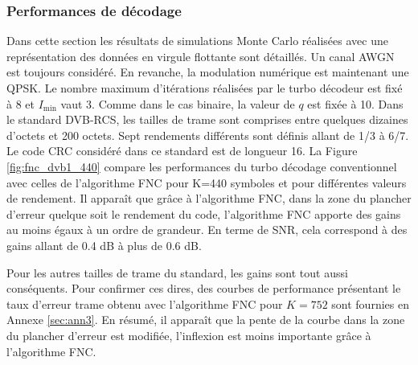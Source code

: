 \subsubsection{Performances de décodage}
Dans cette section les résultats de simulations Monte Carlo réalisées avec une représentation des données en virgule
flottante sont détaillés. Un canal AWGN est toujours considéré. En revanche, la modulation numérique est maintenant une QPSK. Le 
nombre maximum d'itérations réalisées par le turbo décodeur est fixé à 8 et $I_{\text{min}}$ vaut 3.
Comme dans le cas binaire, la valeur de $q$ est fixée à 10. Dans le standard DVB-RCS, les tailles de trame sont comprises
entre quelques dizaines d'octets et 200 octets. Sept rendements différents sont définis allant de 1/3 à 6/7. Le code CRC 
considéré dans ce standard est de longueur 16. La Figure \ref{fig:fnc_dvb1_440} compare les performances du turbo décodage
conventionnel avec celles de l'algorithme FNC pour K=440 symboles et pour différentes valeurs de rendement. 
Il apparaît que grâce à l'algorithme FNC, dans la zone du plancher d'erreur quelque soit le rendement du code, l'algorithme FNC apporte 
des gains au moins égaux à un ordre de grandeur. 
En terme de SNR, cela correspond à des gains allant de 0.4 dB à plus de 
0.6 dB.

Pour les autres tailles de trame du standard, les gains sont tout aussi conséquents. Pour confirmer ces
dires, des courbes de performance présentant le taux d'erreur trame obtenu avec l'algorithme FNC pour $K=752$ sont fournies en 
Annexe \ref{sec:ann3}. En résumé, il apparaît que la pente de la courbe dans la zone du plancher d'erreur est modifiée, l'inflexion
est moins importante grâce à l'algorithme FNC.

